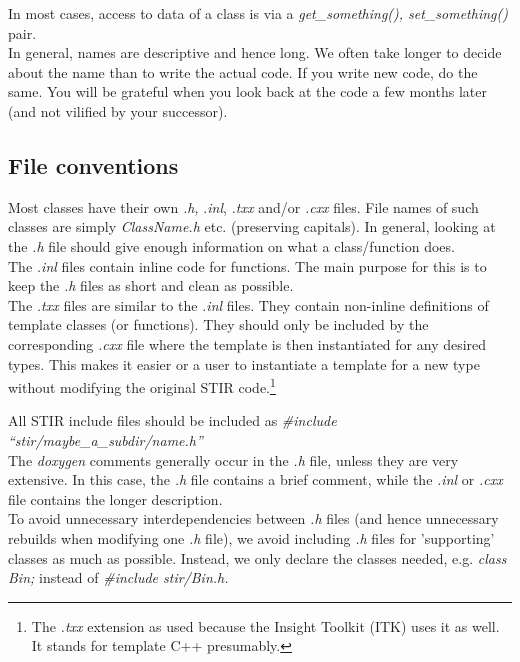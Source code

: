 \documentclass{article}
\begin{document}
In most cases, access to data of a class is via a \textit{get\_something(), 
set\_something()} pair.\\
In general, names are descriptive and hence long. We often take 
longer to decide about the name than to write the actual code. 
If you write new code, do the same. You will be grateful when 
you look back at the code a few months later (and not vilified 
by your successor). 

\subsection{
File conventions }

Most classes have their own \textit{.h,} .\textit{inl}, \textit{.txx} and/or \textit{.cxx} files. 
File names of such classes are simply \textit{ClassName.h} {\nobreakspace}etc. 
(preserving capitals). In general, looking at 
the \textit{.h} file should give enough information on what a class/function 
does. \\
The \textit{.inl} files contain inline code 
for functions. The main purpose for this is to keep the \textit{.h} 
files as short and clean as possible. \\
The \textit{.txx} files are similar to the \textit{.inl} files. They contain non-inline 
definitions of template classes (or functions). They should only be included by the
corresponding \textit{.cxx} file where the template is then instantiated for any desired types.
This makes it easier or a user to instantiate a template for a new type without modifying the
original STIR code.\footnote{The \textit{.txx} extension as used because the Insight Toolkit (ITK) 
uses it as well. It stands for template C++ presumably.}


All STIR include files should be included as \textit{\#include ``stir/maybe\_a\_subdir/name.h''}\\
The \textit{doxygen} comments generally occur in the \textit{.h} file, unless 
they are very extensive. In this case, the \textit{.h} file contains 
a brief comment, while the \textit{.inl} or \textit{.cxx} file contains 
the longer description.\\
To avoid unnecessary interdependencies between \textit{.h} files (and 
hence unnecessary rebuilds when modifying one \textit{.h} file), we 
avoid including \textit{.h} files for 'supporting' classes as much 
as possible. Instead, we only declare the classes needed, e.g. \textit{class 
Bin;} instead of \textit{\#include stir/Bin.h.}
\end{document}
